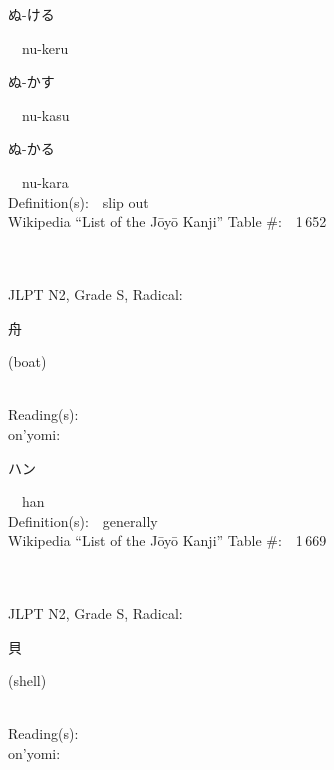 \begin{multicols}{2}
{\hspace*{2em}}{\begin{CJK}{UTF8}{min} ぬ-ける \end{CJK}}\ \ nu-keru\ \ \\
{\hspace*{2em}}{\begin{CJK}{UTF8}{min} ぬ-かす \end{CJK}}\ \ nu-kasu\ \ \\
{\hspace*{2em}}{\begin{CJK}{UTF8}{min} ぬ-かる \end{CJK}}\ \ nu-kara\ \ \\
Definition(s):\ \ slip out \\
Wikipedia ``List of the J\=oy\=o Kanji'' Table \#:\ \ 1\,652 \\
\ \ \\
{\fontsize{34pt}{40pt}  }\ \ \\  %
{JLPT N2, Grade S, Radical:\ \ {\begin{CJK}{UTF8}{min} 舟 \end{CJK}} (boat) } \\
Reading(s):\ \ \\
{\hspace*{1em}}on'yomi:\ \ \\
{\hspace*{2em}}{\begin{CJK}{UTF8}{min} ハン \end{CJK}}\ \ han\ \ \\
Definition(s):\ \ generally \\
Wikipedia ``List of the J\=oy\=o Kanji'' Table \#:\ \ 1\,669 \\
\ \ \\
{\fontsize{34pt}{40pt}  }\ \ \\  %
{JLPT N2, Grade S, Radical:\ \ {\begin{CJK}{UTF8}{min} 貝 \end{CJK}} (shell) } \\
Reading(s):\ \ \\
{\hspace*{1em}}on'yomi:\ \ \\

\end{multicols}
